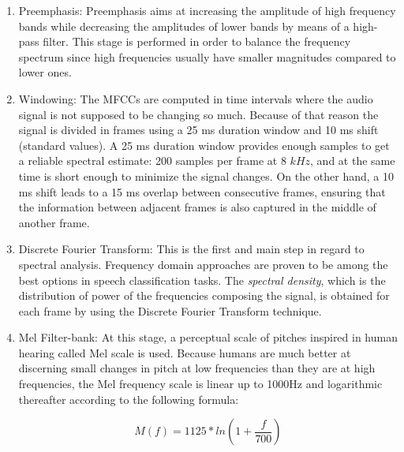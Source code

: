 \begin{enumerate}

  \item Preemphasis: Preemphasis aims at increasing the amplitude of high frequency bands while
  decreasing the amplitudes of lower bands by means of a high-pass filter. This stage is performed
  in order to balance the frequency spectrum since high frequencies usually have smaller
  magnitudes compared to lower ones.

  \item Windowing: The MFCCs are computed in time intervals where the audio signal is not
  supposed to be changing
  so much. Because of that reason the signal is divided in frames using a
  25 ms duration window and 10 ms shift (standard values). A 25 ms duration window provides
  enough samples to get a reliable spectral estimate: 200 samples per frame at 8 $kHz$,
  and at the same time is short enough to minimize the signal changes.
  On the other hand, a 10 ms shift leads to a
  15 ms overlap between consecutive frames, ensuring that the information between adjacent
  frames is also captured in the middle of another frame.

  \item Discrete Fourier Transform: This is the first and main step in regard to spectral
  analysis. Frequency domain approaches are proven to be
  among the best options in speech classification tasks.
  The \textit{spectral density}, which is the distribution of power
  of the frequencies composing the signal, is obtained for each frame by using
  the Discrete Fourier Transform technique.   %

  \item Mel Filter-bank: At this stage, a perceptual scale of pitches inspired in human
  hearing called Mel scale is used. Because humans are much better at discerning small changes
  in pitch at low frequencies than they are at high frequencies,
  the Mel frequency scale is linear up to 1000Hz and logarithmic thereafter according to
  the following formula:

  \begin{equation}
    M(f)=1125*ln(1 + \frac{f}{700})
  \end{equation}


\end{enumerate}
